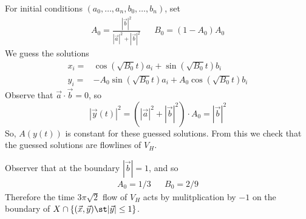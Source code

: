 For initial conditions $(a_0, \ldots, a_n, b_0, \ldots, b_n)$, set 
\begin{align*}
    A_0 = \frac{|\vec b|^2}{|\vec a|^2 +|\vec b|^2}  && B_0=(1-A_0)A_0
\end{align*}
We guess the solutions
\begin{align*}x_i =& \cos(\sqrt{B_0}t ) a_i + \sin(\sqrt{B_0}t)b_i \\
y_i =& -A_0\sin(\sqrt{B_0}t) a_i  + A_0\cos(\sqrt{B_0}t) b_i
\end{align*}
Observe that $\vec a \cdot \vec b =0$, so 
\[|\vec y(t)|^2=(|\vec a|^2 + |\vec b|^2)\cdot A_0 = |\vec b|^2\]
So, $A(y(t))$ is constant for these guessed solutions. From this we check that the guessed solutions are flowlines of $V_H$.

Observer that at the boundary $|\vec b|=1$, and so  
\begin{align*}
    A_0=1/3 && B_0=2/9
\end{align*}
 Therefore the time $3\pi \sqrt{2}$ flow of $V_H$ acts by mulitplication by $-1$ on the boundary of $X\cap \{(\vec x, \vec y) \st |\vec y|\leq 1\}$.
